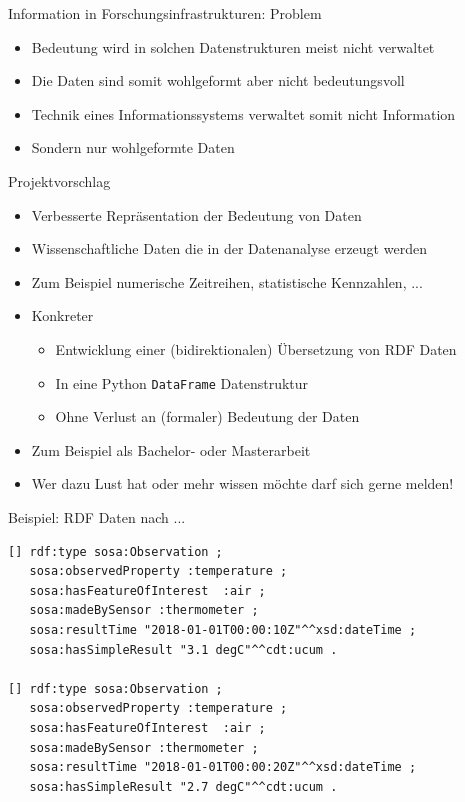 \documentclass{beamer}
\begin{document}
\begin{frame}{Information in Forschungsinfrastrukturen: Problem}
	
	\begin{itemize}
		\item Bedeutung wird in solchen Datenstrukturen meist nicht verwaltet
		\item Die Daten sind somit wohlgeformt aber nicht bedeutungsvoll
		\item Technik eines Informationssystems verwaltet somit nicht Information
		\item Sondern nur wohlgeformte Daten
	\end{itemize}
	
\end{frame}

\begin{frame}{Projektvorschlag}
	
	\begin{itemize}
		\item Verbesserte Repräsentation der Bedeutung von Daten
		\item Wissenschaftliche Daten die in der Datenanalyse erzeugt werden
		\item Zum Beispiel numerische Zeitreihen, statistische Kennzahlen, ...
		\item Konkreter
		\begin{itemize}
			\item Entwicklung einer (bidirektionalen) Übersetzung von RDF Daten
			\item In eine Python \texttt{DataFrame} Datenstruktur
			\item Ohne Verlust an (formaler) Bedeutung der Daten
		\end{itemize}
		\item Zum Beispiel als Bachelor- oder Masterarbeit
		\item Wer dazu Lust hat oder mehr wissen möchte darf sich gerne melden!
	\end{itemize}
	
\end{frame}

\begin{frame}[fragile]{Beispiel: RDF Daten nach ...}
	
	\begin{lstlisting}
[] rdf:type sosa:Observation ;
   sosa:observedProperty :temperature ;
   sosa:hasFeatureOfInterest  :air ;
   sosa:madeBySensor :thermometer ;
   sosa:resultTime "2018-01-01T00:00:10Z"^^xsd:dateTime ;
   sosa:hasSimpleResult "3.1 degC"^^cdt:ucum .
   
[] rdf:type sosa:Observation ;
   sosa:observedProperty :temperature ;
   sosa:hasFeatureOfInterest  :air ;
   sosa:madeBySensor :thermometer ;
   sosa:resultTime "2018-01-01T00:00:20Z"^^xsd:dateTime ;
   sosa:hasSimpleResult "2.7 degC"^^cdt:ucum .
	\end{lstlisting}
	
\end{frame}
\end{document}
